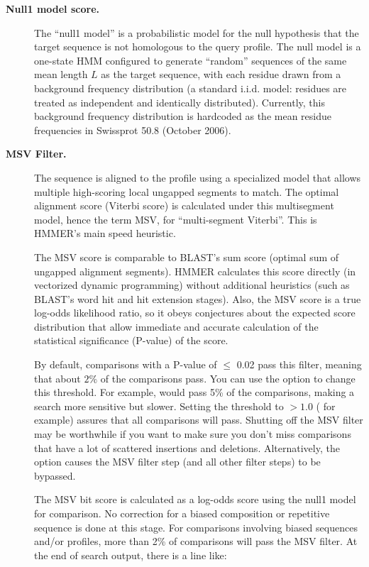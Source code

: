 \begin{description}

\item[\textbf{Null1 model score.}]  

  The ``null1 model'' is a probabilistic model for the null hypothesis
  that the target sequence is not homologous to the query profile. The
  null model is a one-state HMM configured to generate ``random''
  sequences of the same mean length $L$ as the target sequence, with
  each residue drawn from a background frequency distribution (a
  standard i.i.d. model: residues are treated as independent and
  identically distributed). Currently, this background frequency
  distribution is hardcoded as the mean residue frequencies in
  Swissprot 50.8 (October 2006).

\item[\textbf{MSV Filter.}] 

 The sequence is aligned to the profile using a specialized model that
 allows multiple high-scoring local ungapped segments to match.  The
 optimal alignment score (Viterbi score) is calculated under this
 multisegment model, hence the term MSV, for ``multi-segment
 Viterbi''. This is HMMER's main speed heuristic.

 The MSV score is comparable to BLAST's sum score (optimal sum of
 ungapped alignment segments). HMMER calculates this score directly
 (in vectorized dynamic programming) without additional heuristics
 (such as BLAST's word hit and hit extension stages). Also, the MSV
 score is a true log-odds likelihood ratio, so it obeys conjectures
 about the expected score distribution \citep{Eddy08} that allow
 immediate and accurate calculation of the statistical significance
 (P-value) of the score.

 By default, comparisons with a P-value of $\leq$ 0.02 pass this
 filter, meaning that about $2\%$ of the comparisons pass. You can use
 the  option to change this threshold. For example,
  would pass 5\% of the comparisons, making a
 search more sensitive but slower. Setting the threshold to $>1.0$
 ( for example) assures that all comparisons will
 pass. Shutting off the MSV filter may be worthwhile if you want to
 make sure you don't miss comparisons that have a lot of scattered
 insertions and deletions. Alternatively, the  option
 causes the MSV filter step (and all other filter steps) to be
 bypassed.

 The MSV bit score is calculated as a log-odds score using the null1
 model for comparison. No correction for a biased composition or
 repetitive sequence is done at this stage. For comparisons involving
 biased sequences and/or profiles, more than 2\% of comparisons will
 pass the MSV filter. At the end of search output, there is a line
 like:


\end{description}
